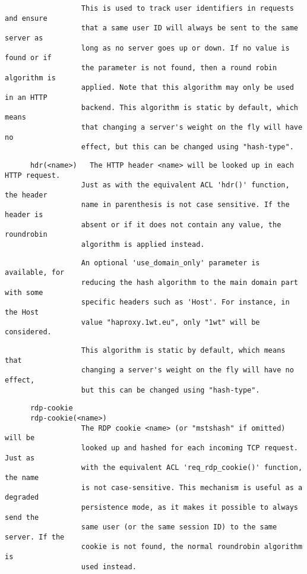 \begin{verbatim}
                  This is used to track user identifiers in requests and ensure
                  that a same user ID will always be sent to the same server as
                  long as no server goes up or down. If no value is found or if
                  the parameter is not found, then a round robin algorithm is
                  applied. Note that this algorithm may only be used in an HTTP
                  backend. This algorithm is static by default, which means
                  that changing a server's weight on the fly will have no
                  effect, but this can be changed using "hash-type".
\end{verbatim}

\begin{verbatim}
      hdr(<name>)   The HTTP header <name> will be looked up in each HTTP request.
                  Just as with the equivalent ACL 'hdr()' function, the header
                  name in parenthesis is not case sensitive. If the header is
                  absent or if it does not contain any value, the roundrobin
                  algorithm is applied instead.
\end{verbatim}

\begin{verbatim}
                  An optional 'use_domain_only' parameter is available, for
                  reducing the hash algorithm to the main domain part with some
                  specific headers such as 'Host'. For instance, in the Host
                  value "haproxy.1wt.eu", only "1wt" will be considered.
\end{verbatim}

\begin{verbatim}
                  This algorithm is static by default, which means that
                  changing a server's weight on the fly will have no effect,
                  but this can be changed using "hash-type".
\end{verbatim}

\begin{verbatim}
      rdp-cookie
      rdp-cookie(<name>)
                  The RDP cookie <name> (or "mstshash" if omitted) will be
                  looked up and hashed for each incoming TCP request. Just as
                  with the equivalent ACL 'req_rdp_cookie()' function, the name
                  is not case-sensitive. This mechanism is useful as a degraded
                  persistence mode, as it makes it possible to always send the
                  same user (or the same session ID) to the same server. If the
                  cookie is not found, the normal roundrobin algorithm is
                  used instead.
\end{verbatim}

